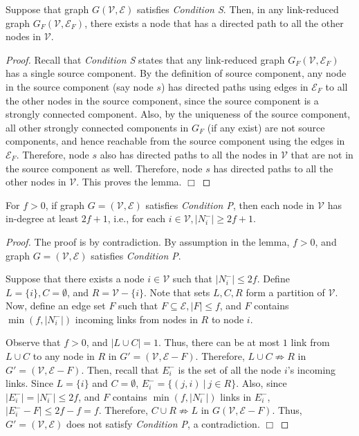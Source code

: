 \documentclass{llncs}
\newcommand{\fillbox}{\hspace*{\fill}\(\Box\)}
\newcommand{\scripte}{\mathcal{E}}
\newcommand{\scriptv}{\mathcal{V}}
\begin{document}
\begin{lemma}
\label{lemma:path}
Suppose that graph $G(\scriptv, \scripte)$ satisfies {\em Condition S}. Then, in any link-reduced graph $G_F(\scriptv, \scripte_F)$, there exists a node that has a directed path to all the other nodes in $\scriptv$.
\end{lemma}


\begin{proof}
Recall that {\em Condition S} states that any link-reduced graph $G_F(\scriptv, \scripte_F)$ has a single source component. By the definition of source component, any node in the source component (say node $s$) has directed paths using edges in $\scripte_F$ to all the other nodes in the source component, since the source component is a strongly connected component. Also, by the uniqueness of the source component, all other strongly connected components in $G_F$ (if any exist) are not source components, and hence reachable from the source component using the edges in $\scripte_F$. Therefore, node $s$ also has directed paths to all the nodes in $\scriptv$ that are not in the source component as well. Therefore, node $s$ has directed paths to all the other nodes in $\scriptv$. This proves the lemma.
\fillbox
\end{proof}



\begin{lemma}
\label{lemma:2f+1}
For $f > 0$, if graph $G=(\scriptv, \scripte)$ satisfies {\em Condition P}, then each node in $\scriptv$ has in-degree at least $2f+1$, i.e., for each $i \in \scriptv, |N_i^-| \geq 2f+1$.
\end{lemma}




\begin{proof}
The proof is by contradiction. By assumption in the lemma, $f > 0$, and graph $G = (\scriptv, \scripte)$ satisfies {\em Condition P}.

Suppose that there exists a node $i \in \scriptv$ such that $|N_i^-| \leq 2f$. Define $L = \{i\}, C = \emptyset$, and $R = \scriptv - \{i\}$. Note that sets $L,C,R$ form a partition of $\scriptv$. Now, define an edge set $F$ such that $F \subseteq \scripte, |F| \leq f$, and $F$ contains $\min(f, |N_i^-|)$ incoming links from nodes in $R$ to node $i$.

Observe that $f > 0$, and $|L \cup C| = 1$. Thus,  there can be at most $1$ link from $L \cup C$ to any node in $R$ in $G' = (\scriptv,\scripte-F)$. Therefore, $L\cup C \not\Rightarrow R$ in $G' = (\scriptv,\scripte-F)$. 
Then, recall that $E_i^-$ is the set of all the node $i$'s incoming links. Since $L = \{i\}$ and $C = \emptyset$, $E_i^- = \{(j,i)~|~j \in R\}$. Also, since $|E_i^-| = |N_i^-| \leq 2f$, and $F$ contains $\min(f, |N_i^-|)$ links in $E_i^-$, $|E_i^- - F| \leq 2f - f = f$. Therefore, $C\cup R \not\Rightarrow L$ in $G(\scriptv,\scripte-F)$.
Thus, $G' = (\scriptv,\scripte)$ does not satisfy {\em Condition P}, a contradiction. 
\fillbox
\end{proof}
\end{document}
